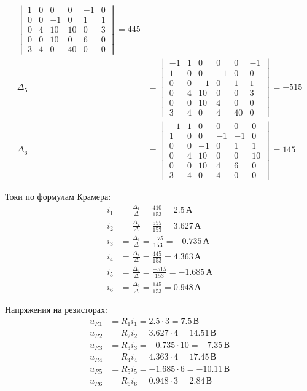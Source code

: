 \begin{align}
\begin{vmatrix}
 1 &  0 &  0 &  0 & -1 &  0 \\
 0 &  0 & -1 &  0 &  1 &  1 \\
 0 &  4 & 10 & 10 &  0 &  3 \\
 0 &  0 & 10 &  0 &  6 &  0 \\
 3 &  4 &  0 & 40 &  0 &  0
\end{vmatrix} = 445 \\
\Delta_5 &= \begin{vmatrix}
-1 &  1 &  0 &  0 &  0 & -1 \\
 1 &  0 &  0 & -1 &  0 &  0 \\
 0 &  0 & -1 &  0 &  1 &  1 \\
 0 &  4 & 10 &  0 &  0 &  3 \\
 0 &  0 & 10 &  4 &  0 &  0 \\
 3 &  4 &  0 &  4 & 40 &  0
\end{vmatrix} = -515 \\
\Delta_6 &= \begin{vmatrix}
-1 &  1 &  0 &  0 &  0 &  0 \\
 1 &  0 &  0 & -1 & -1 &  0 \\
 0 &  0 & -1 &  0 &  1 &  1 \\
 0 &  4 & 10 &  0 &  0 & 10 \\
 0 &  0 & 10 &  4 &  6 &  0 \\
 3 &  4 &  0 &  4 &  0 &  0
\end{vmatrix} = 145
\end{align}

Токи по формулам Крамера:
\begin{align}
i_1 &= \frac{\Delta_1}{\Delta} = \frac{410}{153} = 2.5\,\text{А} \\
i_2 &= \frac{\Delta_2}{\Delta} = \frac{555}{153} = 3.627\,\text{А} \\
i_3 &= \frac{\Delta_3}{\Delta} = \frac{-75}{153} = -0.735\,\text{А} \\
i_4 &= \frac{\Delta_4}{\Delta} = \frac{445}{153} = 4.363\,\text{А} \\
i_5 &= \frac{\Delta_5}{\Delta} = \frac{-515}{153} = -1.685\,\text{А} \\
i_6 &= \frac{\Delta_6}{\Delta} = \frac{145}{153} = 0.948\,\text{А}
\end{align}

Напряжения на резисторах:
\begin{align*}
u_{R1} &= R_1 i_1 = 2.5 \cdot 3 = 7.5\,\text{В} \\
u_{R2} &= R_2 i_2 = 3.627 \cdot 4 = 14.51\,\text{В} \\
u_{R3} &= R_3 i_3 = -0.735 \cdot 10 = -7.35\,\text{В} \\
u_{R4} &= R_4 i_4 = 4.363 \cdot 4 = 17.45\,\text{В} \\
u_{R5} &= R_5 i_5 = -1.685 \cdot 6 = -10.11\,\text{В} \\
u_{R6} &= R_6 i_6 = 0.948 \cdot 3 = 2.84\,\text{В}
\end{align*}

